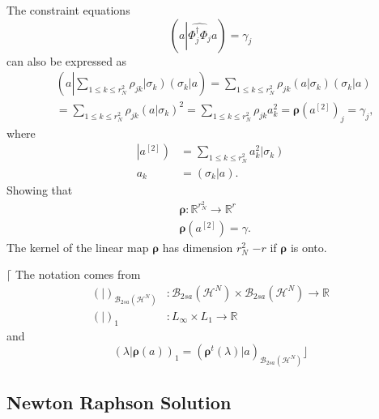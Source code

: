 \documentclass[aps,preprint]{revtex4}%
\begin{document}
The constraint equations
\begin{equation}
\left(  a\left\vert \widehat{\Phi_{j}^{\dagger}\Phi_{j}}\right.  a\right)
=\gamma_{j}%
\end{equation}
can also be expressed as
\begin{align}
&  \left(  a\left\vert \sum_{1\leq k\leq r_{N}^{2}}\rho_{jk}\left\vert
\sigma_{k}\right)  \left(  \sigma_{k}\right\vert \right.  a\right)
=\sum_{1\leq k\leq r_{N}^{2}}\rho_{jk}\left(  \left.  \overset{}{a}\right\vert
\sigma_{k}\right)  \left(  \left.  \overset{}{\sigma}_{k}\right\vert a\right)
\nonumber\\
&  =\sum_{1\leq k\leq r_{N}^{2}}\rho_{jk}\left(  \left.  \overset{}{a}%
\right\vert \sigma_{k}\right)  ^{2}=\sum_{1\leq k\leq r_{N}^{2}}\rho_{jk}%
a_{k}^{2}=\mathbf{\rho}\left(  a^{\left[  2\right]  }\right)  _{j}=\gamma_{j},
\end{align}
where
\begin{align}
\left\vert a^{\left[  2\right]  }\right)   &  =\sum_{1\leq k\leq r_{N}^{2}%
}a_{k}^{2}\left\vert \sigma_{k}\right) \nonumber\\
a_{k}  &  =\left(  \left.  \overset{}{\sigma}_{k}\right\vert a\right)  .
\end{align}
Showing that
\begin{align}
&  \mathbf{\rho}:\mathbb{R}^{r_{N}^{2}}\rightarrow\mathbb{R}^{r}\nonumber\\
&  \mathbf{\rho}\left(  a^{\left[  2\right]  }\right)  =\gamma.
\end{align}
The kernel of the linear map $\mathbf{\rho}$ has dimension $r_{N}^{2}$ $-r$ if
$\mathbf{\rho}$ is onto.

$\lceil$ The notation comes from
\begin{align}
\left(  |\right)  _{\mathcal{B}_{2sa}\left(  \mathcal{H}^{N}\right)  }  &
:\mathcal{B}_{2sa}\left(  \mathcal{H}^{N}\right)  \times\mathcal{B}%
_{2sa}\left(  \mathcal{H}^{N}\right)  \rightarrow\mathbb{R}\nonumber\\
\left(  |\right)  _{1}  &  :L_{\infty}\times L_{1}\rightarrow\mathbb{R}%
\end{align}
and
\begin{equation}
\left(  \lambda|\mathbf{\rho}\left(  a\right)  \right)  _{1}=\left(
\mathbf{\rho}^{t}\left(  \lambda\right)  |a\right)  _{\mathcal{B}_{2sa}\left(
\mathcal{H}^{N}\right)  }\rfloor
\end{equation}


\subsection{Newton Raphson Solution}
\end{document}
